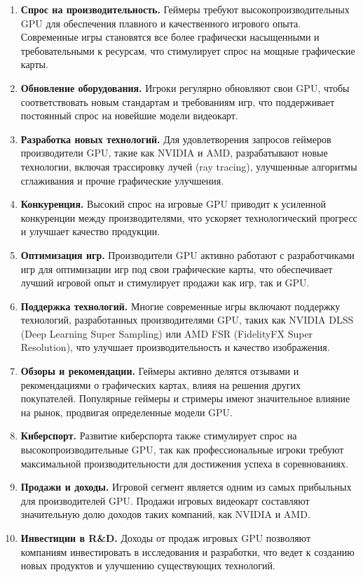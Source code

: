 \documentclass[14pt, a4paper]{extarticle}
\begin{document}
  \begin{enumerate}
  \item\textbf{Спрос на производительность.}
  Геймеры требуют высокопроизводительных GPU для обеспечения плавного и качественного игрового опыта. Современные игры становятся все более графически насыщенными и требовательными к ресурсам, что стимулирует спрос на мощные графические карты.
  \item\textbf{Обновление оборудования.}
  Игроки регулярно обновляют свои GPU, чтобы соответствовать новым стандартам и требованиям игр, что поддерживает постоянный спрос на новейшие модели видеокарт.
  \item\textbf{Разработка новых технологий.}
  Для удовлетворения запросов геймеров производители GPU, такие как NVIDIA и AMD, разрабатывают новые технологии, включая трассировку лучей (ray tracing), улучшенные алгоритмы сглаживания и прочие графические улучшения.
  \item\textbf{Конкуренция.}
  Высокий спрос на игровые GPU приводит к усиленной конкуренции между производителями, что ускоряет технологический прогресс и улучшает качество продукции.
  \item\textbf{Оптимизация игр.}
  Производители GPU активно работают с разработчиками игр для оптимизации игр под свои графические карты, что обеспечивает лучший игровой опыт и стимулирует продажи как игр, так и GPU.
  \item\textbf{Поддержка технологий.}
  Многие современные игры включают поддержку технологий, разработанных производителями GPU, таких как NVIDIA DLSS (Deep Learning Super Sampling) или AMD FSR (FidelityFX Super Resolution), что улучшает производительность и качество изображения.
  \item\textbf{Обзоры и рекомендации.}
  Геймеры активно делятся отзывами и рекомендациями о графических картах, влияя на решения других покупателей. Популярные геймеры и стримеры имеют значительное влияние на рынок, продвигая определенные модели GPU.
  \item\textbf{Киберспорт.}
  Развитие киберспорта также стимулирует спрос на высокопроизводительные GPU, так как профессиональные игроки требуют максимальной производительности для достижения успеха в соревнованиях.
  \item\textbf{Продажи и доходы.}
  Игровой сегмент является одним из самых прибыльных для производителей GPU. Продажи игровых видеокарт составляют значительную долю доходов таких компаний, как NVIDIA и AMD.
  \item\textbf{Инвестиции в R\&D.}
  Доходы от продаж игровых GPU позволяют компаниям инвестировать в исследования и разработки, что ведет к созданию новых продуктов и улучшению существующих технологий.
  \end{enumerate}
\end{document}
